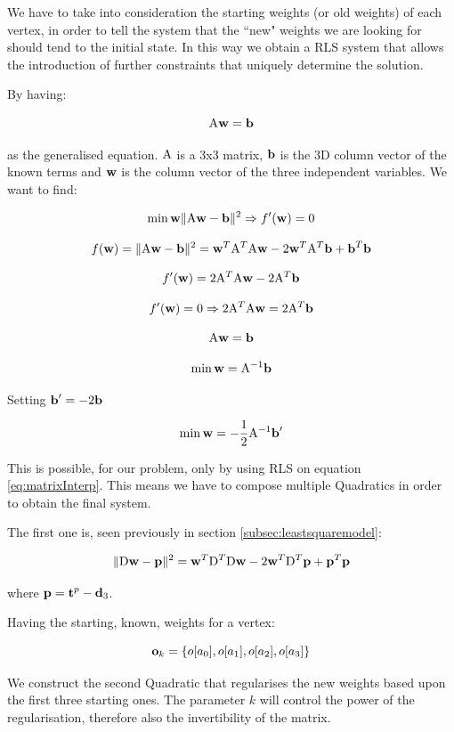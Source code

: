 \documentclass[12pt,twoside]{report}
\begin{document}
We have to take into consideration the starting weights (or old weights) of each vertex, in order to tell the system that the ``new" weights we are looking for should tend to the initial state. In this way we obtain a RLS system that allows the introduction of further constraints that uniquely determine the solution.

By having:

\begin{equation}
    \label{eq:matrixInterp}
    \mathrm{A}\boldsymbol{ \mathrm{w} }=\boldsymbol{ \mathrm{b} }
\end{equation}

as the generalised equation. $\mathrm{A}$ is a 3x3 matrix, $\boldsymbol{ \mathrm{b} }$ is the 3D column vector of the known terms and $\boldsymbol{ \mathrm{w} }$ is the column vector of the three independent variables. We want to find:

\[\min\boldsymbol{ \mathrm{w} } \|\mathrm{A}\boldsymbol{ \mathrm{w} }-\boldsymbol{ \mathrm{b} }\|^2 \Rightarrow f'(\boldsymbol{ \mathrm{w} }) = 0\]

\[f(\boldsymbol{ \mathrm{w} }) = \|\mathrm{A}\boldsymbol{ \mathrm{w} }-\boldsymbol{ \mathrm{b} }\|^2 = \boldsymbol{ \mathrm{w} }^T\mathrm{A}^T\mathrm{A}\boldsymbol{ \mathrm{w} } - 2\boldsymbol{ \mathrm{w} }^T\mathrm{A}^T\boldsymbol{ \mathrm{b} } + \boldsymbol{ \mathrm{b} }^T\boldsymbol{ \mathrm{b} }\]

\[f'(\boldsymbol{ \mathrm{w} }) = 2\mathrm{A}^T\mathrm{A}\boldsymbol{ \mathrm{w} } - 2\mathrm{A}^T\boldsymbol{ \mathrm{b} }\]

\[f'(\boldsymbol{ \mathrm{w} }) = 0 \Rightarrow 2\mathrm{A}^T\mathrm{A}\boldsymbol{ \mathrm{w} } = 2\mathrm{A}^T\boldsymbol{ \mathrm{b} }\]

\[\mathrm{A}\boldsymbol{ \mathrm{w} } = \boldsymbol{ \mathrm{b} }\]

\[\min\boldsymbol{ \mathrm{w} } = \mathrm{A}^{-1}\boldsymbol{ \mathrm{b} }\]

Setting $\boldsymbol{ \mathrm{b} }' = -2\boldsymbol{ \mathrm{b} }$

\[\min\boldsymbol{ \mathrm{w} } = -\frac{1}{2}\mathrm{A}^{-1}\boldsymbol{ \mathrm{b} }'\]



This is possible, for our problem, only by using RLS on equation \ref{eq:matrixInterp}. This means we have to compose multiple Quadratics in order to obtain the final system.

The first one is, seen previously in section \ref{subsec:leastsquaremodel}:

\[\|\mathrm{D}\boldsymbol{ \mathrm{w} }-\boldsymbol{ \mathrm{p} }\|{^2} = \boldsymbol{ \mathrm{w} }^T \mathrm{D}^T\mathrm{D}\boldsymbol{ \mathrm{w} } - 2\boldsymbol{ \mathrm{w} }^T\mathrm{D}^T \boldsymbol{ \mathrm{p} } + \boldsymbol{ \mathrm{p} }^T\boldsymbol{ \mathrm{p} }\]

where $\boldsymbol{ \mathrm{p} }=\boldsymbol{ \mathrm{t} }^p - \boldsymbol{ \mathrm{d} }_3$.

Having the starting, known, weights for a vertex:

\[\boldsymbol{ \mathrm{o} }_k = \{o[a_0], o[a_1], o[a_2], o[a_3]\}\]

We construct the second Quadratic that regularises the new weights based upon the first three starting ones. The parameter $k$ will control the power of the regularisation, therefore also the invertibility of the matrix.
\end{document}
